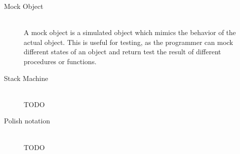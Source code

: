 \begin{description}
\item[Mock Object] \hfill \\
  A mock object is a simulated object which mimics the behavior of the
  actual object. This is useful for testing, as the programmer can
  mock different states of an object and return test the result of
  different procedures or functions. %

\item[Stack Machine] \hfill \\
  TODO

\item[Polish notation] \hfill \\
  TODO

\end{description}



% 

% 
